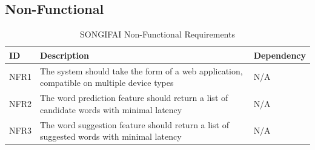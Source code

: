 \subsection{Non-Functional}
\begin{table}[ht]
\caption{SONGIFAI Non-Functional Requirements}
\centering
	\begin{tabular}{ | l | p{10cm} | l | }
		\hline
		\textbf{ID} & \textbf{Description} & \textbf{Dependency} \\ \hline
		NFR1 & The system should take the form of a web application, compatible on multiple device types & N/A \\ \hline
		NFR2 & The word prediction feature should return a list of candidate words with minimal latency & N/A \\ \hline
		NFR3 & The word suggestion feature should return a list of suggested words with minimal latency & N/A \\ \hline
	\end{tabular}
	\label{Tab:Tcr}
\end{table}


